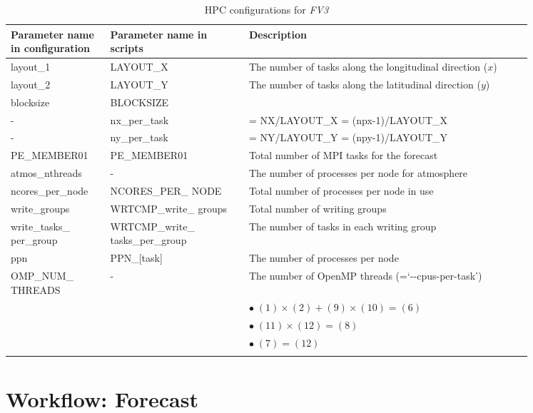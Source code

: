 \documentclass[11pt,fleqn]{report}              %
\begin{document}
{
\fontsize{9}{11}\selectfont
\begin{longtable}{p{0.15\linewidth} | p{0.23\linewidth} | p{0.47\linewidth} }
\hline
\hline
Parameter name in configuration & Parameter name in scripts & Description  \\
\hline
 layout\_1 & LAYOUT\_X & The number of tasks along the longitudinal direction ($x$)  \\
 layout\_2 & LAYOUT\_Y & The number of tasks along the latitudinal direction ($y$)  \\
 blocksize & BLOCKSIZE & \\
 - & nx\_per\_task & = NX/LAYOUT\_X = (npx-1)/LAYOUT\_X \\
 - & ny\_per\_task & = NY/LAYOUT\_Y = (npy-1)/LAYOUT\_Y \\
\hdashline
 PE\_MEMBER01 & PE\_MEMBER01 & Total number of MPI tasks for the forecast  \\
 atmos\_nthreads & - & The number of processes per node for atmosphere \\
 ncores\_per\_node & NCORES\_PER\_ NODE & Total number of processes per node in use \\
\hdashline
write\_groups & WRTCMP\_write\_ groups & Total number of writing groups \\
 write\_tasks\_ per\_group & WRTCMP\_write\_ tasks\_per\_group &The number of tasks in each writing group  \\
\hdashline
 ppn & PPN\_[task] & The number of processes per node   \\ 
 OMP\_NUM\_ THREADS & - & The number of OpenMP threads (=`-{}-cpus-per-task')  \\
\hline
 & & $\bullet \; (1)\times(2)+(9)\times(10)=(6)$ \\
  & & $\bullet \; (11)\times(12)=(8)$ \\
  & & $\bullet \; (7)=(12)$ \\
\hline
\caption{HPC configurations for {\it FV3}}
\label{table:fv3_hpc_config}
\end{longtable}
}




\chapter{Workflow: Forecast}               
\label{chpt:workflow_forecast}
\end{document}
